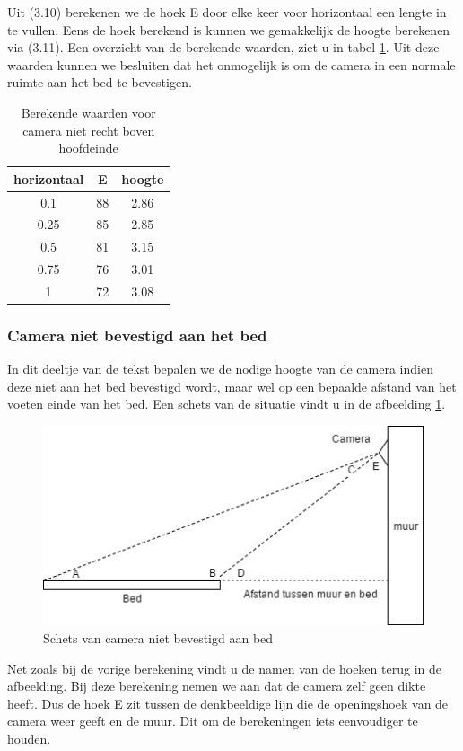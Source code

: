 Uit (3.10) berekenen we de hoek E door elke keer voor horizontaal een lengte in te vullen. Eens de hoek berekend is kunnen we gemakkelijk de hoogte berekenen via (3.11). Een overzicht van de berekende waarden, ziet u in tabel \ref{refTabCNRBB}. Uit deze waarden kunnen we besluiten dat het onmogelijk is om de camera in een normale ruimte aan het bed te bevestigen.
\begin{table}[hbp]
	\caption{Berekende waarden voor camera niet recht boven hoofdeinde}
	\begin{tabular}{|c|c|c|}
		\hline
		horizontaal & E & hoogte \\ \hline
		0.1 & 88 & 2.86 \\ \hline
		0.25 & 85 & 2.85 \\ \hline
		0.5 & 81 & 3.15 \\ \hline
		0.75 & 76 & 3.01 \\ \hline
		1 &  72 & 3.08 \\
		\hline
	\end{tabular}
	\label{refTabCNRBB}
\end{table}

\subsubsection{Camera niet bevestigd aan het bed}
In dit deeltje van de tekst bepalen we de nodige hoogte van de camera indien deze niet aan het bed bevestigd wordt, maar wel op een bepaalde afstand van het voeten einde van het bed. Een schets van de situatie vindt u in de afbeelding \ref{imgCNB}. 
\begin{figure}[hbp]
	\includegraphics[scale=0.7]{CameraNietAanBed}
	\caption{Schets van camera niet bevestigd aan bed}
	\label{imgCNB}
\end{figure}
Net zoals bij de vorige berekening vindt u de namen van de hoeken terug in de afbeelding. Bij deze berekening nemen we aan dat de camera zelf geen dikte heeft. Dus de hoek E zit tussen de denkbeeldige lijn die de openingshoek van de camera weer geeft en de muur. Dit om de berekeningen iets eenvoudiger te houden. 

